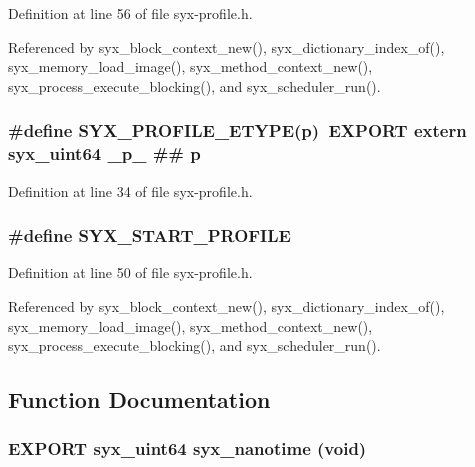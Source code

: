 Definition at line 56 of file syx-profile.h.

Referenced by syx\_\-block\_\-context\_\-new(), syx\_\-dictionary\_\-index\_\-of(), syx\_\-memory\_\-load\_\-image(), syx\_\-method\_\-context\_\-new(), syx\_\-process\_\-execute\_\-blocking(), and syx\_\-scheduler\_\-run().\hypertarget{syx-profile_8h_02010071fff3c02c81c25249b1fc9481}{
\subsubsection{\setlength{\rightskip}{0pt plus 5cm}\#define SYX\_\-PROFILE\_\-ETYPE(p)~EXPORT extern {\bf syx\_\-uint64} \_\-p\_\- \#\# p}}
\label{syx-profile_8h_02010071fff3c02c81c25249b1fc9481}




Definition at line 34 of file syx-profile.h.\hypertarget{syx-profile_8h_3b9369ab3f0b8d0366b7f97b9b2e9913}{
\subsubsection{\setlength{\rightskip}{0pt plus 5cm}\#define SYX\_\-START\_\-PROFILE}}
\label{syx-profile_8h_3b9369ab3f0b8d0366b7f97b9b2e9913}




Definition at line 50 of file syx-profile.h.

Referenced by syx\_\-block\_\-context\_\-new(), syx\_\-dictionary\_\-index\_\-of(), syx\_\-memory\_\-load\_\-image(), syx\_\-method\_\-context\_\-new(), syx\_\-process\_\-execute\_\-blocking(), and syx\_\-scheduler\_\-run().

\subsection{Function Documentation}
\hypertarget{syx-profile_8h_1053a009362cd6785e723dcfe951bd64}{
\subsubsection{\setlength{\rightskip}{0pt plus 5cm}EXPORT {\bf syx\_\-uint64} syx\_\-nanotime (void)}}
\label{syx-profile_8h_1053a009362cd6785e723dcfe951bd64}


